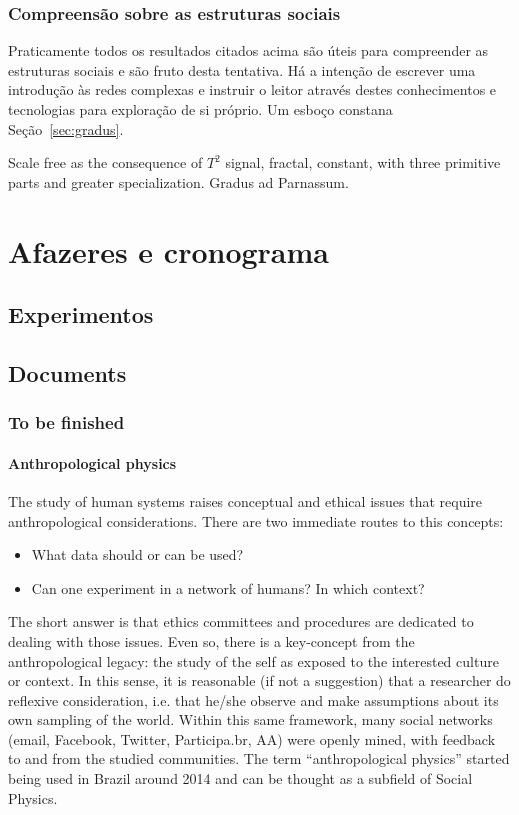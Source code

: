 \documentclass[a4paper,openright,12pt]{report} %
\begin{document}
\subsection{Compreensão sobre as estruturas sociais}
Praticamente todos os resultados citados acima
são úteis para compreender as estruturas sociais e são
fruto desta tentativa.
Há a intenção de escrever uma introdução às redes complexas
e instruir o leitor através destes conhecimentos e tecnologias
para exploração de si próprio. Um esboço
constana Seção~\ref{sec:gradus}.



Scale free as the consequence of $T^2$ signal, fractal, constant, with three primitive parts and greater specialization. Gradus ad Parnassum.

\chapter{Afazeres e cronograma}
\section{Experimentos}\label{sec:exp}
\section{Documents}
\subsection{To be finished}
\subsubsection{Anthropological physics}
The study of human systems raises conceptual
and ethical issues that require anthropological considerations.
There are two immediate routes to this concepts:
\begin{itemize}
	\item What data should or can be used?
	\item Can one experiment in a network of humans? In which context?
\end{itemize}

The short answer is that ethics committees and procedures are dedicated to dealing with those issues.
Even so, there is a key-concept from the anthropological legacy: the study of the self as exposed to the interested culture or context. 
In this sense, it is reasonable (if not a suggestion) that
a researcher do reflexive consideration, 
i.e. that he/she observe and make assumptions about its own sampling of the world.
Within this same framework, many social networks (email, Facebook, Twitter, Participa.br, AA) were openly mined,
with feedback to and from the studied communities.
The term ``anthropological physics'' started being used in Brazil around
2014 and can be thought as a subfield of Social Physics.
\end{document}
